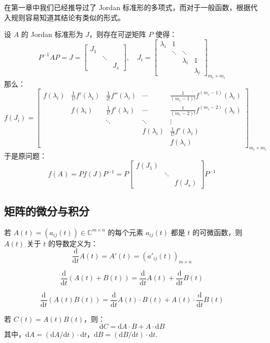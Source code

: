 在第一章中我们已经推导过了 Jordan 标准形的多项式，而对于一般函数，根据代入规则容易知道其结论有类似的形式。

设 $A$ 的 Jordan 标准形为 $J$，则存在可逆矩阵 $P$ 使得：
\[
    P^{-1}AP=J=\begin{bmatrix}J_1&&\\&\ddots&\\&&J_s\end{bmatrix},\quad J_i=\begin{bmatrix}\lambda_i&1&&\\&\ddots&\ddots&\\&&\lambda_i&1\\&&&\lambda_i\end{bmatrix}_{m_i\times m_i}
\]
那么：
\[
    f(J_i)=\begin{bmatrix}
    f(\lambda_i)&\frac{1}{1!}f'(\lambda_i)&\frac{1}{2!}f''(\lambda_i)&\cdots&\frac{1}{(m_i-1)!}f^{(m_i-1)}(\lambda_i)\\
    &f(\lambda_i)&\frac{1}{1!}f'(\lambda_i)&\cdots&\frac{1}{(m_i-2)!}f^{(m_i-2)}(\lambda_i)\\
    &&\ddots&\ddots&\vdots\\
    &&&f(\lambda_i)&\frac{1}{1!}f'(\lambda_i)\\
    &&&&f(\lambda_i)
    \end{bmatrix}_{m_i\times m_i}
\]
于是原问题：
\[
    f(A)=Pf(J)P^{-1}=P\begin{bmatrix}f(J_1)&&\\&\ddots&\\&&f(J_s)\end{bmatrix}P^{-1}
\]


\subsection{矩阵的微分与积分}

\begin{definition}[矩阵的导数]
若 $A(t)=\left(a_{ij}(t)\right)\in\mathbb C^{m\times n}$ 的每个元素 $a_{ij}(t)$ 都是 $t$ 的可微函数，则 $A(t)$ 关于 $t$ 的导数定义为：
\[
    \frac{\mathrm d}{\mathrm dt}A(t)=A'(t)=\left(a'_{ij}(t)\right)_{m\times n}
\]
\end{definition}
\begin{property}
\[
    \frac{\mathrm d}{\mathrm dt}(A(t)+B(t))=\frac{\mathrm d}{\mathrm dt}A(t)+\frac{\mathrm d}{\mathrm dt}B(t)
\]
\end{property}
\begin{property}
\[
    \frac{\mathrm d}{\mathrm dt}(A(t)B(t))=\frac{\mathrm d}{\mathrm dt}A(t)\cdot B(t)+A(t)\cdot\frac{\mathrm d}{\mathrm dt}B(t)
\]
\end{property}
\begin{corollary}
若 $C(t)=A(t)B(t)$，则：
\[
    \mathrm dC=\mathrm dA\cdot B+A\cdot\mathrm dB
\]
其中，$\mathrm dA=(\mathrm dA/\mathrm dt)\cdot \mathrm dt$，$\mathrm dB=(\mathrm dB/\mathrm dt)\cdot \mathrm dt$.
\end{corollary}

